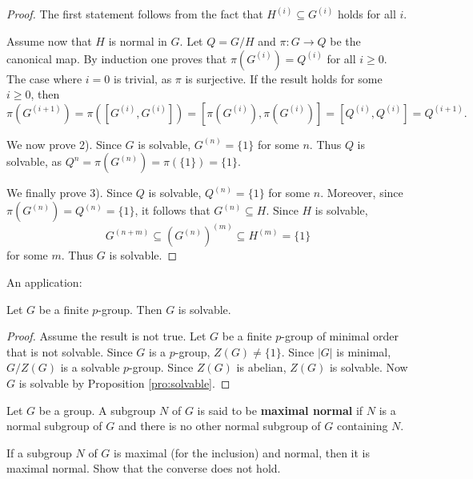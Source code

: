 \begin{proof}
    The first statement follows from the fact that
    $H^{(i)}\subseteq G^{(i)}$ holds for all $i$. 
 
    Assume now that $H$ is normal in $G$. 
    Let $Q=G/H$ and $\pi\colon G\to Q$ be the canonical map.
    By induction one proves that $\pi(G^{(i)})=Q^{(i)}$ for all $i\geq0$.
    The case where $i=0$ is trivial, as $\pi$ is surjective. 
    If the result holds for some $i\geq0$, then
    \[
            \pi(G^{(i+1)})=\pi([G^{(i)},G^{(i)}])=[\pi(G^{(i)}),\pi(G^{(i)})]=[Q^{(i)},Q^{(i)}]=Q^{(i+1)}.
    \]

    We now prove 2). Since $G$ is solvable, $G^{(n)}=\{1\}$ for some $n$. 
    Thus $Q$ is solvable, as $Q^{n}=\pi(G^{(n)})=\pi(\{1\})=\{1\}$. 

    We finally prove 3). 
    Since $Q$ is solvable, $Q^{(n)}=\{1\}$ for some $n$.
    Moreover, since $\pi(G^{(n)})=Q^{(n)}=\{1\}$, it follows that
    $G^{(n)}\subseteq H$. Since $H$
    is solvable, 
    \[
        G^{(n+m)}\subseteq (G^{(n)})^{(m)}\subseteq H^{(m)}=\{1\}
    \]
    for some $m$. Thus $G$ is solvable.
\end{proof}

An application:

\begin{proposition}
    Let $G$ be a finite $p$-group. Then $G$ is solvable. 
\end{proposition}

\begin{proof}
    Assume the result is not true. Let $G$ be a finite
    $p$-group of minimal order that is not solvable. Since 
    $G$ is a $p$-group, $Z(G)\ne\{1\}$. Since $|G|$ is minimal, 
    $G/Z(G)$ is a solvable $p$-group. Since $Z(G)$ is abelian, 
    $Z(G)$ is solvable. Now $G$ is solvable 
    by Proposition \ref{pro:solvable}.
\end{proof}

Let $G$ be a group. A subgroup $N$ of $G$ is said to be \textbf{maximal normal} 
if $N$ is a normal subgroup of $G$ and there is no other normal subgroup of $G$ 
containing $N$. 

\begin{exercise}
    If a subgroup $N$ of $G$ is maximal (for the inclusion) and
    normal, then it is maximal normal. Show that the converse does not hold.
\end{exercise}


